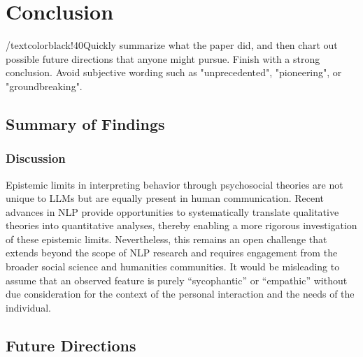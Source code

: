 
\section{Conclusion}\label{sec:Conclusion}
/textcolor{black!40}{Quickly summarize what the paper did, and then chart out possible future directions that anyone might pursue. Finish with a strong conclusion. Avoid subjective wording such as "unprecedented", "pioneering", or "groundbreaking".}
\subsection{Summary of Findings}
\textcolor{black!30}{\lipsum[63-64]}

\subsubsection{Discussion}
Epistemic limits in interpreting behavior through psychosocial theories are not unique to LLMs but are equally present in human communication. Recent advances in NLP provide opportunities to systematically translate qualitative theories into quantitative analyses, thereby enabling a more rigorous investigation of these epistemic limits. Nevertheless, this remains an open challenge that extends beyond the scope of NLP research and requires engagement from the broader social science and humanities communities.
It would be misleading to assume that an observed feature is purely “sycophantic” or “empathic” without due consideration for the context of the personal interaction and the needs of the individual.
\subsection{Future Directions}
\textcolor{black!30}{\lipsum[65]}


